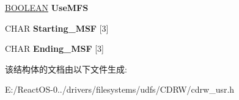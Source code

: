 \begin{DoxyCompactItemize}
\begin{tabbing}
\end{tabbing}\item 
\mbox{\label{struct___l_l___r_e_a_d___u_s_e_r___i_n_a48381c7cec04eb88b242315cbf4231b8}} 
\hyperlink{_processor_bind_8h_a112e3146cb38b6ee95e64d85842e380a}{B\+O\+O\+L\+E\+AN} {\bfseries Use\+M\+FS}
\item 
\mbox{\label{struct___l_l___r_e_a_d___u_s_e_r___i_n_a7b517cd612e327600c7b8051f21668ee}} 
C\+H\+AR {\bfseries Starting\+\_\+\+M\+SF} \mbox{[}3\mbox{]}
\item 
\mbox{\label{struct___l_l___r_e_a_d___u_s_e_r___i_n_a70d4412cd6f4b10b0ff8d7d551fffa8b}} 
C\+H\+AR {\bfseries Ending\+\_\+\+M\+SF} \mbox{[}3\mbox{]}
\end{DoxyCompactItemize}


该结构体的文档由以下文件生成\+:\begin{DoxyCompactItemize}
\item 
E\+:/\+React\+O\+S-\/0../drivers/filesystems/udfs/\+C\+D\+R\+W/cdrw\+\_\+usr.\+h\end{DoxyCompactItemize}
